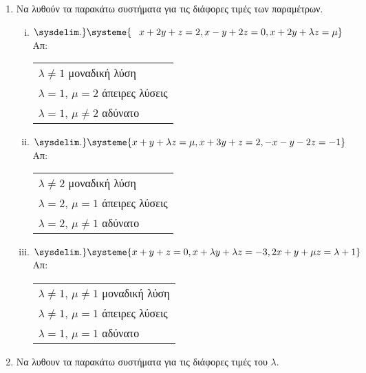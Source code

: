 


\usepackage{systeme}

\pagestyle{vangelis}

\setlength{\itemsep}{\baselineskip}


\begin{center}
\end{center}

\vspace{\baselineskip}

\begin{enumerate}
	\setlength{\itemsep}{\baselineskip}
\item Να λυθούν τα παρακάτω συστήματα για τις διάφορες τιμές των παραμέτρων.

	\begin{enumerate}[i)]
		\setlength{\itemsep}{\baselineskip}
\item $\sysdelim.\} \systeme{\phantom{-}x+2y+z=2, x-y+2z=0, x+2y+\lambda z= \mu}$ \hfill Απ: \begin{tabular}{l}
		$\lambda\neq 1$ μοναδική λύση \\
		$\lambda=1$, $\mu=2$ άπειρες λύσεις \\
		$\lambda=1$, $\mu\neq 2$ αδύνατο
	\end{tabular}
		 \item $\sysdelim.\} \systeme{x+y+\lambda z = \mu, x+3y+z = 2, -x-y-2z = -1}$ \hfill Απ: \begin{tabular}{l}
				 $\lambda\neq 2$ μοναδική λύση \\
				 $\lambda=2$, $\mu=1$ άπειρες λύσεις \\
				 $\lambda=2$, $\mu\neq 1$ αδύνατο
			 \end{tabular}

\item $ \sysdelim.\} \systeme{
x + y + z = 0, 
x + \lambda y + \lambda z = -3, 
2x + y + \mu z = \lambda + 1
} $ \hfill Απ: \begin{tabular}{l}
	$ \lambda \neq 1 $, $ \mu \neq 1 $ μοναδική λύση \\
	$ \lambda \neq  1 $, $ \mu = 1 $ άπειρες λύσεις \\
	$ \lambda =1 $, $ \mu = 1 $  αδύνατο  
	

\end{tabular}

	\end{enumerate}

\item Να λυθουν τα παρακάτω συστήματα για τις διάφορες τιμές του $ \lambda $.


\end{enumerate}
